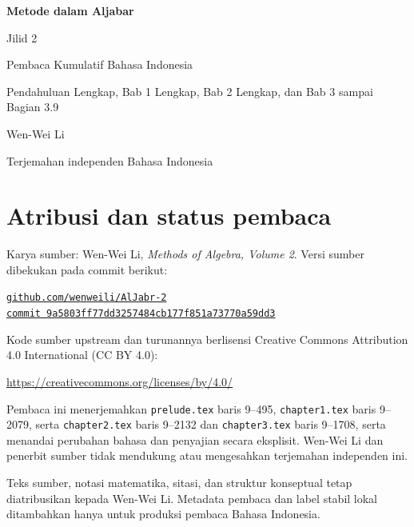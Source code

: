 \documentclass[
  colors=true,
  fontsetup=font-setup-id.tex,
  titlesetup=titles-setup.tex
]{AJbook2}
\theoremstyle{plain}
\theoremstyle{nonumberplain}
\numberwithin{equation}{section}
\numberwithin{figure}{section}
\begin{document}
\begin{titlepage}
  \centering
  \vspace*{0.16\textheight}
  {\Huge\bfseries Metode dalam Aljabar\par}
  \vspace{0.8em}
  {\LARGE Jilid 2\par}
  \vspace{1.8em}
  {\Large Pembaca Kumulatif Bahasa Indonesia\par}
  \vspace{0.6em}
  {\large Pendahuluan Lengkap, Bab 1 Lengkap, Bab 2 Lengkap, dan Bab 3 sampai Bagian 3.9\par}
  \vfill
  {\Large Wen-Wei Li\par}
  \vspace{0.6em}
  {\normalsize Terjemahan independen Bahasa Indonesia\par}
  \vspace*{0.10\textheight}
\end{titlepage}

\cleardoublepage
\thispagestyle{empty}
\section*{Atribusi dan status pembaca}
Karya sumber: Wen-Wei Li, \emph{Methods of Algebra, Volume 2}. Versi
sumber dibekukan pada commit berikut:
\begin{center}
  \small
  \href{https://github.com/wenweili/AlJabr-2}{\texttt{github.com/wenweili/AlJabr-2}}\\
  \href{https://github.com/wenweili/AlJabr-2/commit/9a5803ff77dd3257484cb177f851a73770a59dd3}{\texttt{commit 9a5803ff77dd3257484cb177f851a73770a59dd3}}
\end{center}
Kode sumber upstream dan turunannya berlisensi Creative Commons
Attribution 4.0 International (CC BY 4.0):
\begin{center}
  \small\url{https://creativecommons.org/licenses/by/4.0/}
\end{center}
Pembaca ini menerjemahkan
\texttt{prelude.tex} baris 9--495, \texttt{chapter1.tex} baris 9--2079,
serta \texttt{chapter2.tex} baris 9--2132 dan \texttt{chapter3.tex} baris
9--1708, serta menandai perubahan bahasa dan penyajian secara eksplisit. Wen-Wei Li dan penerbit sumber tidak
mendukung atau mengesahkan terjemahan independen ini.

\medskip
Teks sumber, notasi matematika, sitasi, dan struktur konseptual tetap
diatribusikan kepada Wen-Wei Li. Metadata pembaca dan label stabil lokal
ditambahkan hanya untuk produksi pembaca Bahasa Indonesia.
\end{document}
